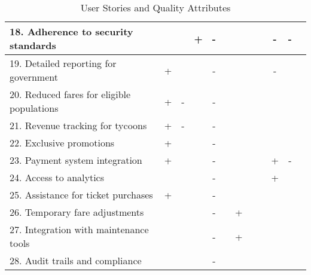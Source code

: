 \begin{table}[H]
{\begin{tabular}{|l|c|c|c|c|c|c|c|c|c|c|c|}
    \hline
    18. Adherence to security standards &  &  & + & - &  &  &  &  & - & - &  \\
    \hline
    19. Detailed reporting for government & + &  &  & - &  &  &  &  & - &  &  \\
    \hline
    20. Reduced fares for eligible populations & + & - &  & - &  &  &  &  &  &  &  \\
    \hline
    21. Revenue tracking for tycoons & + & - &  & - &  &  &  &  &  &  &  \\
    \hline
    22. Exclusive promotions & + &  &  & - &  &  &  &  &  &  &  \\
    \hline
    23. Payment system integration & + &  &  & - &  &  &  &  & + & - &  \\
    \hline
    24. Access to analytics &  &  &  & - &  &  &  &  & + &  &  \\
    \hline
    25. Assistance for ticket purchases & + &  &  & - &  &  &  &  &  &  &  \\
    \hline
    26. Temporary fare adjustments &  &  &  & - &  & + &  &  &  &  &  \\
    \hline
    27. Integration with maintenance tools &  &  &  & - &  & + &  &  &  &  &  \\
    \hline
    28. Audit trails and compliance &  &  &  & - &  &  &  &  &  &  &  \\
    \hline
    \end{tabular}%
    }
    \caption{User Stories and Quality Attributes}
\end{table}